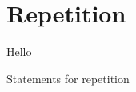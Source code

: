 \section{Repetition}
\label{sec:flow:repetition}

Hello

\begin{syntaxfloat}
  
  \caption{Statements for repetition}
  \label{syntax:flow:repetition}
\end{syntaxfloat}
